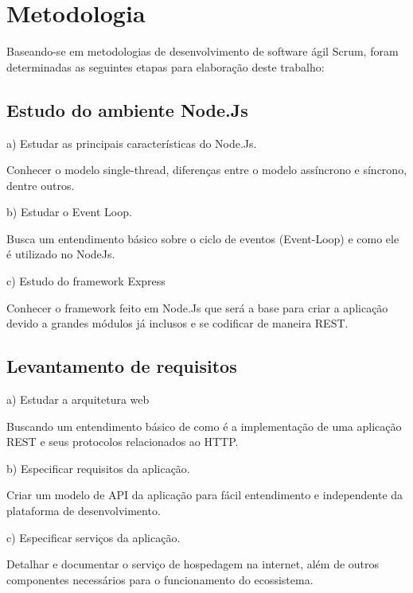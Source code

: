 \chapter{Metodologia}
\label{metodologia}

\vspace{-1.9cm}

  Baseando-se em metodologias de desenvolvimento de software ágil Scrum, foram determinadas 
  as seguintes etapas para elaboração deste trabalho:


\section{Estudo do ambiente Node.Js}
  
  \begin{compactitem}
    \item[a)] Estudar as principais características do Node.Js.
    
    Conhecer o modelo single-thread, diferenças entre o modelo assíncrono e síncrono, dentre outros.
    
    \item[b)] Estudar o Event Loop.
    
    Busca um entendimento básico sobre o ciclo de eventos (Event-Loop) e como ele é utilizado no NodeJs.
    
    \item[c)] Estudo do framework Express
    
    Conhecer o framework feito em Node.Js que será a base para criar a 
    aplicação devido a grandes módulos já inclusos e se codificar de maneira \ac{REST}.

  \end{compactitem}
  
\section{Levantamento de requisitos}

  \begin{compactitem}
    \item[a)] Estudar a arquitetura web
    
    Buscando um entendimento básico de como é a implementação de uma aplicação 
    \ac{REST} e seus protocolos relacionados ao HTTP.
    
    \item[b)] Especificar requisitos da aplicação.
    
    Criar um modelo de API da aplicação para fácil entendimento e
    independente da plataforma de desenvolvimento.
    
    \item[c)] Especificar serviços da aplicação.
    
    Detalhar e documentar o serviço de hospedagem na internet, além de outros componentes 
    necessários para o funcionamento do ecossistema.
      
  \end{compactitem}

